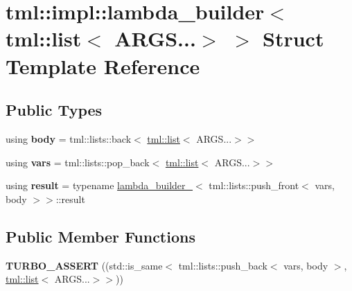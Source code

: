 \hypertarget{structtml_1_1impl_1_1lambda__builder_3_01tml_1_1list_3_01_a_r_g_s_8_8_8_4_01_4}{\section{tml\+:\+:impl\+:\+:lambda\+\_\+builder$<$ tml\+:\+:list$<$ A\+R\+G\+S...$>$ $>$ Struct Template Reference}
\label{structtml_1_1impl_1_1lambda__builder_3_01tml_1_1list_3_01_a_r_g_s_8_8_8_4_01_4}
}
\subsection*{Public Types}
\begin{DoxyCompactItemize}
\item 
\hypertarget{structtml_1_1impl_1_1lambda__builder_3_01tml_1_1list_3_01_a_r_g_s_8_8_8_4_01_4_a255a0138d291b6017e7e48b05c70b481}{using {\bfseries body} = tml\+::lists\+::back$<$ \hyperlink{structtml_1_1list}{tml\+::list}$<$ A\+R\+G\+S...$>$$>$}\label{structtml_1_1impl_1_1lambda__builder_3_01tml_1_1list_3_01_a_r_g_s_8_8_8_4_01_4_a255a0138d291b6017e7e48b05c70b481}

\item 
\hypertarget{structtml_1_1impl_1_1lambda__builder_3_01tml_1_1list_3_01_a_r_g_s_8_8_8_4_01_4_a517ba7f0c4a793e7e15a177395897b9e}{using {\bfseries vars} = tml\+::lists\+::pop\+\_\+back$<$ \hyperlink{structtml_1_1list}{tml\+::list}$<$ A\+R\+G\+S...$>$$>$}\label{structtml_1_1impl_1_1lambda__builder_3_01tml_1_1list_3_01_a_r_g_s_8_8_8_4_01_4_a517ba7f0c4a793e7e15a177395897b9e}

\item 
\hypertarget{structtml_1_1impl_1_1lambda__builder_3_01tml_1_1list_3_01_a_r_g_s_8_8_8_4_01_4_a36622880ba9a73f0aab116a22a6e4194}{using {\bfseries result} = typename \hyperlink{structtml_1_1impl_1_1lambda__builder__2}{lambda\+\_\+builder\+\_}$<$ tml\+::lists\+::push\+\_\+front$<$ vars, body $>$$>$\+::result}\label{structtml_1_1impl_1_1lambda__builder_3_01tml_1_1list_3_01_a_r_g_s_8_8_8_4_01_4_a36622880ba9a73f0aab116a22a6e4194}

\end{DoxyCompactItemize}
\subsection*{Public Member Functions}
\begin{DoxyCompactItemize}
\item 
\hypertarget{structtml_1_1impl_1_1lambda__builder_3_01tml_1_1list_3_01_a_r_g_s_8_8_8_4_01_4_a17f429e94339ade40fadc25f22834927}{{\bfseries T\+U\+R\+B\+O\+\_\+\+A\+S\+S\+E\+R\+T} ((std\+::is\+\_\+same$<$ tml\+::lists\+::push\+\_\+back$<$ vars, body $>$, \hyperlink{structtml_1_1list}{tml\+::list}$<$ A\+R\+G\+S...$>$$>$))}\label{structtml_1_1impl_1_1lambda__builder_3_01tml_1_1list_3_01_a_r_g_s_8_8_8_4_01_4_a17f429e94339ade40fadc25f22834927}

\end{DoxyCompactItemize}


